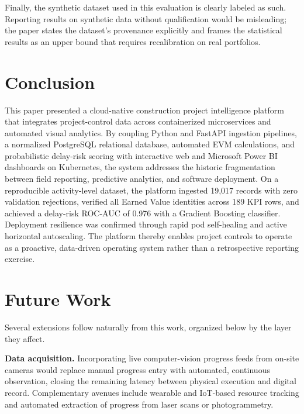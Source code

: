 \documentclass[conference]{IEEEtran}
\begin{document}
Finally, the synthetic dataset used in this evaluation is clearly labeled as such. Reporting results on synthetic data without qualification would be misleading; the paper states the dataset's provenance explicitly and frames the statistical results as an upper bound that requires recalibration on real portfolios.

\section{Conclusion}

This paper presented a cloud-native construction project intelligence platform that integrates project-control data across containerized microservices and automated visual analytics. By coupling Python and FastAPI ingestion pipelines, a normalized PostgreSQL relational database, automated EVM calculations, and probabilistic delay-risk scoring with interactive web and Microsoft Power BI dashboards on Kubernetes, the system addresses the historic fragmentation between field reporting, predictive analytics, and software deployment. On a reproducible activity-level dataset, the platform ingested 19,017 records with zero validation rejections, verified all Earned Value identities across 189 KPI rows, and achieved a delay-risk ROC-AUC of 0.976 with a Gradient Boosting classifier. Deployment resilience was confirmed through rapid pod self-healing and active horizontal autoscaling. The platform thereby enables project controls to operate as a proactive, data-driven operating system rather than a retrospective reporting exercise.

\section{Future Work}

Several extensions follow naturally from this work, organized below by the layer they affect.

\textbf{Data acquisition.} Incorporating live computer-vision progress feeds from on-site cameras would replace manual progress entry with automated, continuous observation, closing the remaining latency between physical execution and digital record. Complementary avenues include wearable and IoT-based resource tracking and automated extraction of progress from laser scans or photogrammetry.
\end{document}
